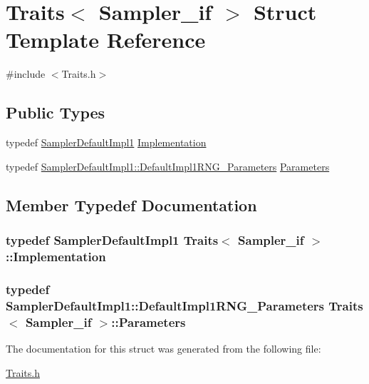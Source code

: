 \hypertarget{struct_traits_3_01_sampler__if_01_4}{}\section{Traits$<$ Sampler\+\_\+if $>$ Struct Template Reference}
\label{struct_traits_3_01_sampler__if_01_4}


{\ttfamily \#include $<$Traits.\+h$>$}

\subsection*{Public Types}
\begin{DoxyCompactItemize}
\item 
typedef \hyperlink{class_sampler_default_impl1}{Sampler\+Default\+Impl1} \hyperlink{struct_traits_3_01_sampler__if_01_4_ab6df776a1c1c3f53d41e257836c6b2d7}{Implementation}
\item 
typedef \hyperlink{class_sampler_default_impl1_1_1_default_impl1_r_n_g___parameters}{Sampler\+Default\+Impl1\+::\+Default\+Impl1\+R\+N\+G\+\_\+\+Parameters} \hyperlink{struct_traits_3_01_sampler__if_01_4_a487504e8c07ee1f93dcdc3e0a9a26de5}{Parameters}
\end{DoxyCompactItemize}


\subsection{Member Typedef Documentation}
\subsubsection[{\texorpdfstring{Implementation}{Implementation}}]{\setlength{\rightskip}{0pt plus 5cm}typedef {\bf Sampler\+Default\+Impl1} {\bf Traits}$<$ {\bf Sampler\+\_\+if} $>$\+::{\bf Implementation}}\hypertarget{struct_traits_3_01_sampler__if_01_4_ab6df776a1c1c3f53d41e257836c6b2d7}{}\label{struct_traits_3_01_sampler__if_01_4_ab6df776a1c1c3f53d41e257836c6b2d7}
\subsubsection[{\texorpdfstring{Parameters}{Parameters}}]{\setlength{\rightskip}{0pt plus 5cm}typedef {\bf Sampler\+Default\+Impl1\+::\+Default\+Impl1\+R\+N\+G\+\_\+\+Parameters} {\bf Traits}$<$ {\bf Sampler\+\_\+if} $>$\+::{\bf Parameters}}\hypertarget{struct_traits_3_01_sampler__if_01_4_a487504e8c07ee1f93dcdc3e0a9a26de5}{}\label{struct_traits_3_01_sampler__if_01_4_a487504e8c07ee1f93dcdc3e0a9a26de5}


The documentation for this struct was generated from the following file\+:\begin{DoxyCompactItemize}
\item 
\hyperlink{_traits_8h}{Traits.\+h}\end{DoxyCompactItemize}
